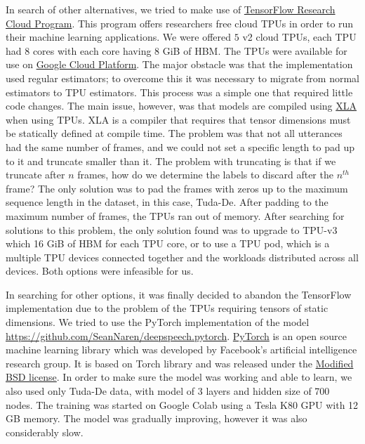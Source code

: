 In search of other alternatives, we tried to make use of \href{https://www.tensorflow.org/tfrc}{TensorFlow Research Cloud Program}. This program offers researchers free cloud \ac{TPU}s in order to run their machine learning applications. We were offered $5$ v2 cloud \ac{TPU}s, each \ac{TPU} had $8$ cores with each core having $8$ GiB of \ac{HBM}. The \ac{TPU}s were available for use on \href{https://cloud.google.com/}{Google Cloud Platform}. The major obstacle was that the implementation used regular estimators; to overcome this it was necessary to migrate from normal estimators to \ac{TPU} estimators. This process was a simple one that required little code changes. The main issue, however, was that models are compiled using \href{https://www.tensorflow.org/xla/}{\ac{XLA}} when using \ac{TPU}s. \ac{XLA} is a compiler that requires that tensor dimensions must be statically defined at compile time. The problem was that not all utterances had the same number of frames, and we could not set a specific length to pad up to it and truncate smaller than it. The problem with truncating is that if we truncate after $n$ frames, how do we determine the labels to discard after the $n^{th}$ frame? The only solution was to pad the frames with zeros up to the maximum sequence length in the dataset, in this case, Tuda-De. After padding to the maximum number of frames, the \ac{TPU}s ran out of memory. After searching for solutions to this problem, the only solution found was to upgrade to TPU-v3 which 16 GiB of \ac{HBM} for each \ac{TPU} core, or to use a \ac{TPU} pod, which is a multiple \ac{TPU} devices connected together and the workloads distributed across all devices. Both options were infeasible for us.


In searching for other options, it was finally decided to abandon the TensorFlow implementation due to the problem of the \ac{TPU}s requiring tensors of static dimensions. We tried to use the PyTorch implementation of the model \url{https://github.com/SeanNaren/deepspeech.pytorch}. 
\href{https://pytorch.org/}{PyTorch} is an open source machine learning library which was developed by 
Facebook's artificial intelligence research group. It is based on Torch library and was released under the \href{https://en.wikipedia.org/wiki/BSD_licenses#3-clause}{ Modified BSD license}. In order to make sure the model was working and able to learn, we also used only Tuda-De data, with model of 3 layers and hidden size of 700 nodes. The training was started on Google Colab using a Tesla K80 GPU with 12 GB memory. The model was gradually improving, however it was also considerably slow.

